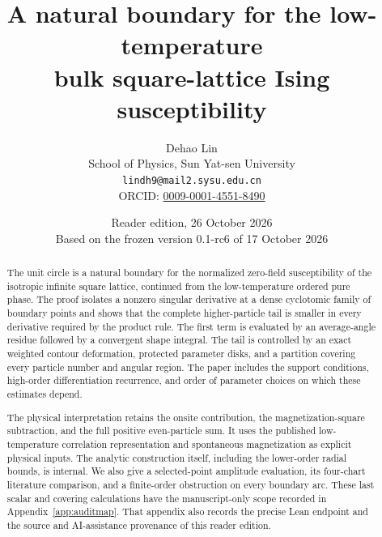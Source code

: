 \documentclass[11pt]{article}
\title{A natural boundary for the low-temperature\\
bulk square-lattice Ising susceptibility}
\author{Dehao Lin\\
\small School of Physics, Sun Yat-sen University\\
\small\texttt{lindh9@mail2.sysu.edu.cn}\\
\small ORCID: \href{https://orcid.org/0009-0001-4551-8490}{0009-0001-4551-8490}}
\date{Reader edition, 26 October 2026\\Based on the frozen version 0.1-rc6 of 17 October 2026}
\numberwithin{equation}{section}
\theoremstyle{definition}
\begin{document}
\maketitle

\begin{abstract}
The unit circle is a natural boundary for the normalized zero-field
susceptibility of the isotropic infinite square lattice, continued from
the low-temperature ordered pure phase. The proof isolates a nonzero
singular derivative at a dense cyclotomic family of boundary points and
shows that the complete higher-particle tail is smaller in every
derivative required by the product rule. The first term is evaluated by
an average-angle residue followed by a convergent shape integral. The
tail is controlled by an exact weighted contour deformation, protected
parameter disks, and a partition covering every particle number and
angular region. The paper includes the support conditions, high-order
differentiation recurrence, and order of parameter choices on which
these estimates depend.

The physical interpretation retains the onsite contribution, the
magnetization-square subtraction, and the full positive even-particle
sum. It uses the published low-temperature correlation representation
and spontaneous magnetization as explicit physical inputs. The analytic
construction itself, including the lower-order radial bounds, is
internal. We also give a selected-point amplitude evaluation, its
four-chart literature comparison, and a finite-order obstruction on
every boundary arc. These last scalar and covering calculations have
the manuscript-only scope recorded in Appendix~\ref{app:auditmap}.
That appendix also records the precise Lean endpoint and the source
and AI-assistance provenance of this reader edition.
\end{abstract}
\end{document}
